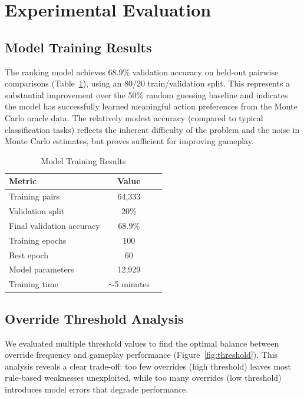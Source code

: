 \documentclass[conference]{IEEEtran}
\begin{document}
\section{Experimental Evaluation}

\subsection{Model Training Results}

The ranking model achieves 68.9\% validation accuracy on held-out pairwise comparisons (Table~\ref{tab:training}), using an 80/20 train/validation split. This represents a substantial improvement over the 50\% random guessing baseline and indicates the model has successfully learned meaningful action preferences from the Monte Carlo oracle data. The relatively modest accuracy (compared to typical classification tasks) reflects the inherent difficulty of the problem and the noise in Monte Carlo estimates, but proves sufficient for improving gameplay.

\begin{table}[htbp]
\caption{Model Training Results}
\begin{center}
\begin{tabular}{lcc}
\toprule
\textbf{Metric} & \textbf{Value} \\
\midrule
Training pairs & 64,333 \\
Validation split & 20\% \\
Final validation accuracy & 68.9\% \\
Training epochs & 100 \\
Best epoch & 60 \\
Model parameters & 12,929 \\
Training time & $\sim$5 minutes \\
\bottomrule
\end{tabular}
\label{tab:training}
\end{center}
\end{table}

\subsection{Override Threshold Analysis}

We evaluated multiple threshold values to find the optimal balance between override frequency and gameplay performance (Figure~\ref{fig:threshold}). This analysis reveals a clear trade-off: too few overrides (high threshold) leaves most rule-based weaknesses unexploited, while too many overrides (low threshold) introduces model errors that degrade performance.
\end{document}

